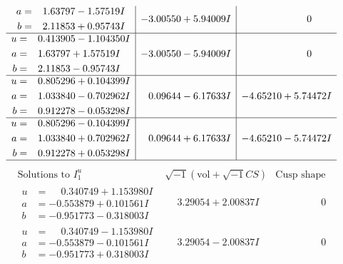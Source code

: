 \documentclass[1p]{elsarticle_modified}
\theoremstyle{definition}
\newcommand{\I}{\sqrt{-1}}
\begin{document}
$$\begin{array}{c|c|c}
\begin{aligned}
a &= \phantom{-}1.63797 - 1.57519 I \\
b &= \phantom{-}2.11853 + 0.95743 I\end{aligned}
 & -3.00550 + 5.94009 I & \phantom{-0.000000 } 0 \\ \hline\begin{aligned}
u &= \phantom{-}0.413905 - 1.104350 I \\
a &= \phantom{-}1.63797 + 1.57519 I \\
b &= \phantom{-}2.11853 - 0.95743 I\end{aligned}
 & -3.00550 - 5.94009 I & \phantom{-0.000000 } 0 \\ \hline\begin{aligned}
u &= \phantom{-}0.805296 + 0.104399 I \\
a &= \phantom{-}1.033840 - 0.702962 I \\
b &= \phantom{-}0.912278 - 0.053298 I\end{aligned}
 & \phantom{-}0.09644 - 6.17633 I & -4.65210 + 5.74472 I \\ \hline\begin{aligned}
u &= \phantom{-}0.805296 - 0.104399 I \\
a &= \phantom{-}1.033840 + 0.702962 I \\
b &= \phantom{-}0.912278 + 0.053298 I\end{aligned}
 & \phantom{-}0.09644 + 6.17633 I & -4.65210 - 5.74472 I\\
 \hline 
 \end{array}$$\newpage$$\begin{array}{c|c|c}  
\text{Solutions to }I^u_{1}& \I (\text{vol} + \sqrt{-1}CS) & \text{Cusp shape}\\
 \hline 
\begin{aligned}
u &= \phantom{-}0.340749 + 1.153980 I \\
a &= -0.553879 + 0.101561 I \\
b &= -0.951773 - 0.318003 I\end{aligned}
 & \phantom{-}3.29054 + 2.00837 I & \phantom{-0.000000 } 0 \\ \hline\begin{aligned}
u &= \phantom{-}0.340749 - 1.153980 I \\
a &= -0.553879 - 0.101561 I \\
b &= -0.951773 + 0.318003 I\end{aligned}
 & \phantom{-}3.29054 - 2.00837 I & \phantom{-0.000000 } 0 \\ \hline\begin{aligned}

\end{aligned}
\end{array}$$
\end{document}

